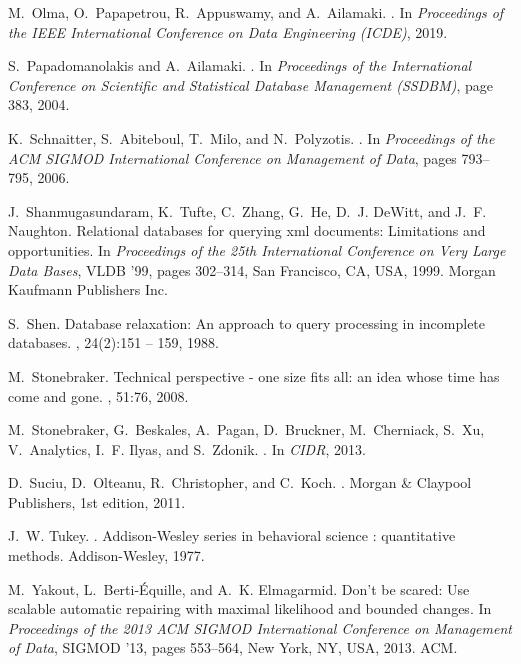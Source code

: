 M.~Olma, O.~Papapetrou, R.~Appuswamy, and A.~Ailamaki.
.
\newblock In {\em Proceedings of the IEEE International Conference on Data
  Engineering (ICDE)}, 2019.

S.~Papadomanolakis and A.~Ailamaki.
.
\newblock In {\em Proceedings of the International Conference on Scientific and
  Statistical Database Management (SSDBM)}, page 383, 2004.

K.~Schnaitter, S.~Abiteboul, T.~Milo, and N.~Polyzotis.
.
\newblock In {\em Proceedings of the ACM SIGMOD International Conference on
  Management of Data}, pages 793--795, 2006.

J.~Shanmugasundaram, K.~Tufte, C.~Zhang, G.~He, D.~J. DeWitt, and J.~F.
  Naughton.
\newblock Relational databases for querying xml documents: Limitations and
  opportunities.
\newblock In {\em Proceedings of the 25th International Conference on Very
  Large Data Bases}, VLDB '99, pages 302--314, San Francisco, CA, USA, 1999.
  Morgan Kaufmann Publishers Inc.

S.~Shen.
\newblock Database relaxation: An approach to query processing in incomplete
  databases.
, 24(2):151 -- 159, 1988.

M.~Stonebraker.
\newblock Technical perspective - one size fits all: an idea whose time has
  come and gone.
, 51:76, 2008.

M.~Stonebraker, G.~Beskales, A.~Pagan, D.~Bruckner, M.~Cherniack, S.~Xu,
  V.~Analytics, I.~F. Ilyas, and S.~Zdonik.
.
\newblock In {\em CIDR}, 2013.

D.~Suciu, D.~Olteanu, R.~Christopher, and C.~Koch.
.
\newblock Morgan \& Claypool Publishers, 1st edition, 2011.

J.~W. Tukey.
.
\newblock Addison-Wesley series in behavioral science : quantitative methods.
  Addison-Wesley, 1977.

M.~Yakout, L.~Berti-\'{E}quille, and A.~K. Elmagarmid.
\newblock Don't be scared: Use scalable automatic repairing with maximal
  likelihood and bounded changes.
\newblock In {\em Proceedings of the 2013 ACM SIGMOD International Conference
  on Management of Data}, SIGMOD '13, pages 553--564, New York, NY, USA, 2013.
  ACM.

